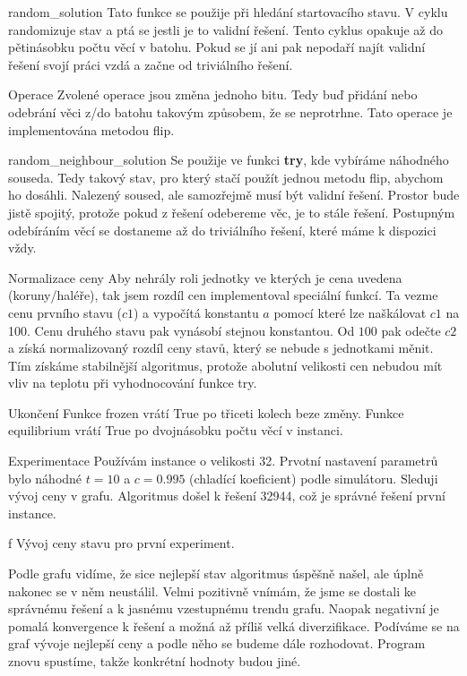 \secc random\_solution
Tato funkce se použije při hledání startovacího stavu. V cyklu randomizuje stav a ptá se jestli je to validní řešení. Tento cyklus opakuje až do pětinásobku počtu věcí v batohu. Pokud se jí ani pak nepodaří najít validní řešení svojí práci vzdá a začne od triviálního řešení.

\secc Operace
Zvolené operace jsou změna jednoho bitu. Tedy buď přidání nebo odebrání věci z/do batohu takovým způsobem, že se neprotrhne. Tato operace je implementována metodou flip.

\secc random\_neighbour\_solution
Se použije ve funkci {\bf try}, kde vybíráme náhodného souseda. Tedy takový stav, pro který stačí použít jednou metodu flip, abychom ho dosáhli. Nalezený soused, ale samozřejmě musí být validní řešení. Prostor bude jistě spojitý, protože pokud z řešení odebereme věc, je to stále řešení. Postupným odebíráním věcí se dostaneme až do triviálního řešení, které máme k dispozici vždy. 

\secc Normalizace ceny
Aby nehrály roli jednotky ve kterých je cena uvedena (koruny/haléře), tak jsem rozdíl cen implementoval speciální funkcí. Ta vezme cenu prvního stavu ($c1$) a vypočítá konstantu $a$ pomocí které lze naškálovat $c1$ na 100. Cenu druhého stavu pak vynásobí stejnou konstantou. Od $100$ pak odečte $c2$ a získá normalizovaný rozdíl ceny stavů, který se nebude s jednotkami měnit. Tím získáme stabilnější algoritmus, protože abolutní velikosti cen nebudou mít vliv na teplotu při vyhodnocování funkce try.


\secc Ukončení
Funkce frozen vrátí True po třiceti kolech beze změny. Funkce equilibrium vrátí True po dvojnásobku počtu věcí v instanci.


\vfill\break
\sec Experimentace
Používám instance o velikosti 32. Prvotní nastavení parametrů bylo náhodné $t = 10$ a $c = 0.995$ (chladící koeficient) podle simulátoru. Sleduji vývoj ceny v grafu. Algoritmus došel k řešení 32944, což je správné řešení první instance.

\centerline{ \picwidth=15cm  }
\caption/f Vývoj ceny stavu pro první experiment.
\bigskip

Podle grafu vidíme, že sice nejlepší stav algoritmus úspěšně našel, ale úplně nakonec se v něm neustálil. Velmi pozitivně vnímám, že jsme se dostali ke správnému řešení a k jasnému vzestupnému trendu grafu. Naopak negativní je pomalá konvergence k řešení a možná až příliš velká diverzifikace. Podíváme se na graf vývoje nejlepší ceny a podle něho se budeme dále rozhodovat. Program znovu spustíme, takže konkrétní hodnoty budou jiné. 


